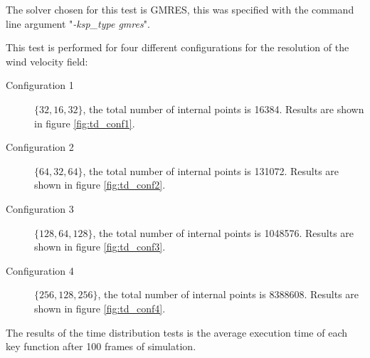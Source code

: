 The solver chosen for this test is GMRES, this was specified with the command
line argument "\emph{-ksp\_type gmres}".

This test is performed for four different configurations for the resolution of
the wind velocity field:
\begin{description}
	\item[Configuration 1] $ \{ 32, 16, 32 \} $, the total number of internal
		points is 16384. Results are shown in figure \ref{fig:td_conf1}.
	\item[Configuration 2] $ \{ 64, 32, 64 \} $, the total number of internal
		points is 131072. Results are shown in figure \ref{fig:td_conf2}.
	\item[Configuration 3] $ \{ 128, 64, 128 \} $, the total number of internal
		points is 1048576. Results are shown in figure \ref{fig:td_conf3}.
	\item[Configuration 4] $ \{ 256, 128, 256 \} $, the total number of internal
		points is 8388608. Results are shown in figure \ref{fig:td_conf4}.
\end{description}

The results of the time distribution tests is the average execution time of each
key function after 100 frames of simulation.

